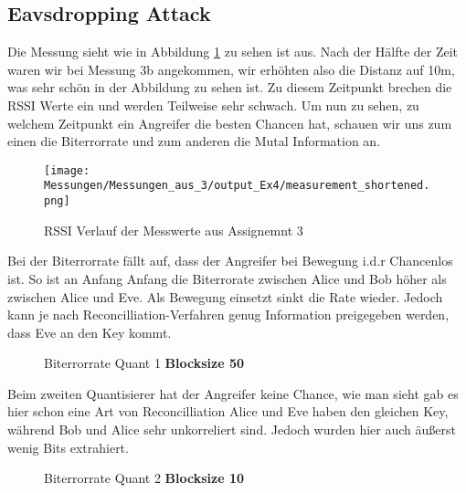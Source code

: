 \documentclass[12pt,a4paper]{article}
\begin{document}
\subsection*{Eavsdropping Attack}
Die Messung sieht wie in Abbildung \ref{test7} zu sehen ist aus. Nach der Hälfte der Zeit waren wir bei Messung 3b angekommen, wir erhöhten also die Distanz auf 10m, was sehr schön in der Abbildung zu sehen ist. Zu diesem Zeitpunkt brechen die RSSI Werte ein und werden Teilweise sehr schwach. Um nun zu sehen, zu welchem Zeitpunkt ein Angreifer die besten Chancen hat, schauen wir uns zum einen die Biterrorrate und zum anderen die Mutal Information an.
\begin{figure}[H]
\centering
\texttt{[image: Messungen/Messungen\_aus\_3/output\_Ex4/measurement\_shortened.png]}
\caption{RSSI Verlauf der Messwerte aus Assignemnt 3}
\label{test7}
\end{figure}
Bei der Biterrorrate fällt auf, dass der Angreifer bei Bewegung i.d.r Chancenlos ist. So ist an Anfang Anfang die Biterrorate zwischen Alice und Bob höher als zwischen Alice und Eve. Als Bewegung einsetzt sinkt die Rate wieder. Jedoch kann je nach Reconcilliation-Verfahren genug Information preigegeben werden, dass Eve an den Key kommt.
\begin{figure}[H]
\centering
{} \qquad
{}  
\caption{Biterrorrate Quant 1 \textbf{Blocksize 50}}
\label{fig:7}
\end{figure}
Beim zweiten Quantisierer hat der Angreifer keine Chance, wie man sieht gab es hier schon eine Art von Reconcilliation Alice und Eve haben den gleichen Key, während Bob und Alice sehr unkorreliert sind. Jedoch wurden hier auch äußerst wenig Bits extrahiert.
\begin{figure}[H]
\centering
{} \qquad
{}  
\caption{Biterrorrate Quant 2 \textbf{Blocksize 10}}
\label{fig:8}
\end{figure}
\end{document}
